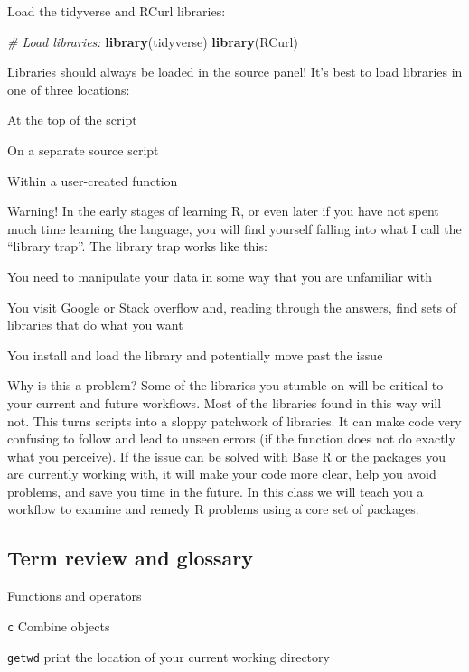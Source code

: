 \documentclass[]{article}
\newenvironment{Shaded}{\begin{snugshade}}{\end{snugshade}}
\newcommand{\KeywordTok}[1]{\textcolor[rgb]{0.13,0.29,0.53}{\textbf{#1}}}
\newcommand{\CommentTok}[1]{\textcolor[rgb]{0.56,0.35,0.01}{\textit{#1}}}
\newcommand{\NormalTok}[1]{#1}
\begin{document}
 Load the tidyverse and RCurl libraries:

\begin{Shaded}
\begin{Highlighting}[]
\CommentTok{# Load libraries:}
\KeywordTok{library}\NormalTok{(tidyverse)}
\KeywordTok{library}\NormalTok{(RCurl)}
\end{Highlighting}
\end{Shaded}

 Libraries should always be loaded in the source panel! It's best to
load libraries in one of three locations:

At the top of the script

On a separate source script

Within a user-created function

 Warning! In the early stages of learning R, or even later if you have
not spent much time learning the language, you will find yourself
falling into what I call the ``library trap''. The library trap works
like this:

You need to manipulate your data in some way that you are unfamiliar
with

You visit Google or Stack overflow and, reading through the answers,
find sets of libraries that do what you want

You install and load the library and potentially move past the issue

Why is this a problem? Some of the libraries you stumble on will be
critical to your current and future workflows. Most of the libraries
found in this way will not. This turns scripts into a sloppy patchwork
of libraries. It can make code very confusing to follow and lead to
unseen errors (if the function does not do exactly what you perceive).
If the issue can be solved with Base R or the packages you are currently
working with, it will make your code more clear, help you avoid
problems, and save you time in the future. In this class we will teach
you a workflow to examine and remedy R problems using a core set of
packages.

\subsection{Term review and glossary}\label{term-review-and-glossary}

Functions and operators

\texttt{c} Combine objects

\texttt{getwd} print the location of your current working directory
\end{document}
